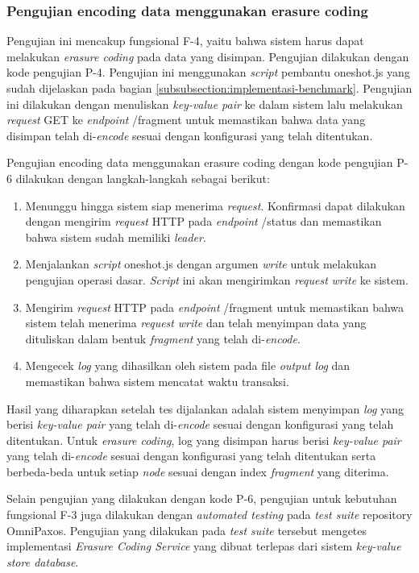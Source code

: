 \subsubsection{Pengujian encoding data menggunakan erasure coding}
\label{subsubsection:pengujian-encoding-data-erasure-coding}

Pengujian ini mencakup fungsional F-4, yaitu bahwa sistem harus dapat melakukan \textit{erasure coding} pada data yang disimpan. Pengujian dilakukan dengan kode pengujian P-4. Pengujian ini menggunakan \textit{script} pembantu oneshot.js yang sudah dijelaskan pada bagian \ref{subsubsection:implementasi-benchmark}. Pengujian ini dilakukan dengan menuliskan \textit{key-value pair} ke dalam sistem lalu melakukan \textit{request} GET ke \textit{endpoint} /fragment untuk memastikan bahwa data yang disimpan telah di-\textit{encode} sesuai dengan konfigurasi yang telah ditentukan.

Pengujian encoding data menggunakan erasure coding dengan kode pengujian P-6 dilakukan dengan langkah-langkah sebagai berikut:
\begin{enumerate}
  \item Menunggu hingga sistem siap menerima \textit{request}. Konfirmasi dapat dilakukan dengan mengirim \textit{request} HTTP pada \textit{endpoint} /status dan memastikan bahwa sistem sudah memiliki \textit{leader}.
  \item Menjalankan \textit{script} oneshot.js dengan argumen \textit{write} untuk melakukan pengujian operasi dasar. \textit{Script} ini akan mengirimkan \textit{request} \textit{write} ke sistem.
  \item Mengirim \textit{request} HTTP pada \textit{endpoint} /fragment untuk memastikan bahwa sistem telah menerima \textit{request} \textit{write} dan telah menyimpan data yang dituliskan dalam bentuk \textit{fragment} yang telah di-\textit{encode}.
  \item Mengecek \textit{log} yang dihasilkan oleh sistem pada file \textit{output log} dan memastikan bahwa sistem mencatat waktu transaksi.
\end{enumerate}

Hasil yang diharapkan setelah tes dijalankan adalah sistem menyimpan \textit{log} yang berisi \textit{key-value pair} yang telah di-\textit{encode} sesuai dengan konfigurasi yang telah ditentukan. Untuk \textit{erasure coding}, log yang disimpan harus berisi \textit{key-value pair} yang telah di-\textit{encode} sesuai dengan konfigurasi yang telah ditentukan serta berbeda-beda untuk setiap \textit{node} sesuai dengan index \textit{fragment} yang diterima.

Selain pengujian yang dilakukan dengan kode P-6, pengujian untuk kebutuhan fungsional F-3 juga dilakukan dengan \textit{automated testing} pada \textit{test suite} repository OmniPaxos. Pengujian yang dilakukan pada \textit{test suite} tersebut mengetes implementasi \textit{Erasure Coding Service} yang dibuat terlepas dari sistem \textit{key-value store database}.